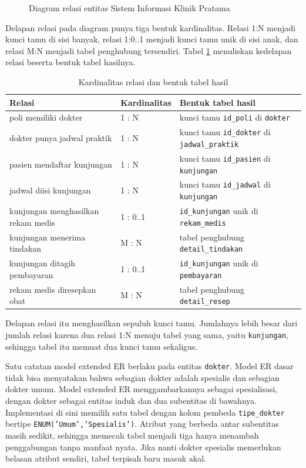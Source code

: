 \documentclass[12pt,a4paper]{article}
\begin{document}
\begin{figure}[ht]
\centering
\resizebox{0.98\textwidth}{!}{}
\caption{Diagram relasi entitas Sistem Informasi Klinik Pratama}
\label{gam:erd-laporan}
\end{figure}

Delapan relasi pada diagram punya tiga bentuk kardinalitas. Relasi 1:N menjadi
kunci tamu di sisi banyak, relasi 1:0..1 menjadi kunci tamu unik di sisi anak,
dan relasi M:N menjadi tabel penghubung tersendiri. Tabel
\ref{tab:kardinalitas-laporan} menuliskan kedelapan relasi beserta bentuk tabel
hasilnya.

\begin{table}[ht]
\centering
\caption{Kardinalitas relasi dan bentuk tabel hasil}
\label{tab:kardinalitas-laporan}
\small
\begin{tabularx}{\textwidth}{@{}p{4.5cm}p{1.6cm}X@{}}
\toprule
\textbf{Relasi} & \textbf{Kardinalitas} & \textbf{Bentuk tabel hasil} \\
\midrule
poli memiliki dokter & 1 : N & kunci tamu \texttt{id\_poli} di \texttt{dokter} \\
dokter punya jadwal praktik & 1 : N & kunci tamu \texttt{id\_dokter} di \texttt{jadwal\_praktik} \\
pasien mendaftar kunjungan & 1 : N & kunci tamu \texttt{id\_pasien} di \texttt{kunjungan} \\
jadwal diisi kunjungan & 1 : N & kunci tamu \texttt{id\_jadwal} di \texttt{kunjungan} \\
kunjungan menghasilkan rekam medis & 1 : 0..1 & \texttt{id\_kunjungan} unik di \texttt{rekam\_medis} \\
kunjungan menerima tindakan & M : N & tabel penghubung \texttt{detail\_tindakan} \\
kunjungan ditagih pembayaran & 1 : 0..1 & \texttt{id\_kunjungan} unik di \texttt{pembayaran} \\
rekam medis diresepkan obat & M : N & tabel penghubung \texttt{detail\_resep} \\
\bottomrule
\end{tabularx}
\end{table}

Delapan relasi itu menghasilkan sepuluh kunci tamu. Jumlahnya lebih besar dari
jumlah relasi karena dua relasi 1:N menuju tabel yang sama, yaitu
\texttt{kunjungan}, sehingga tabel itu memuat dua kunci tamu sekaligus.

Satu catatan model extended ER berlaku pada entitas \texttt{dokter}. Model ER
dasar tidak bisa menyatakan bahwa sebagian dokter adalah spesialis dan sebagian
dokter umum. Model extended ER menggambarkannya sebagai spesialisasi, dengan
dokter sebagai entitas induk dan dua subentitas di bawahnya. Implementasi di
sini memilih satu tabel dengan kolom pembeda \texttt{tipe\_dokter} bertipe
\texttt{ENUM('Umum','Spesialis')}. Atribut yang berbeda antar subentitas masih
sedikit, sehingga memecah tabel menjadi tiga hanya menambah penggabungan tanpa
manfaat nyata. Jika nanti dokter spesialis memerlukan belasan atribut sendiri,
tabel terpisah baru masuk akal.
\end{document}
